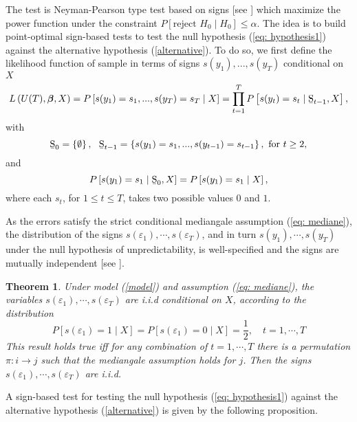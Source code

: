 \documentclass[harvard,11pt]{article}
\newtheorem{theorem}{Theorem}
\begin{document}
The test is Neyman-Pearson type test based on signs [see \citet{lehmann2006testing}] which maximize the
power function under the constraint $P\left[ \text{reject }%
H_{0}\mid H_{0}\right] \leq \alpha$. The idea is to build		
point-optimal sign-based tests to test the null hypothesis (\ref{eq:
hypothesis1}) against the alternative hypothesis (\ref{alternative}). To do
so, we first define the likelihood function of sample in terms of signs $%
s(y_{1}),...,s(y_{T})$ conditional on $X$%
\begin{equation*}
L\left( U(T),\bm{\beta}, X \right) =P\left[
s(y_{1})=s_{1},...,s(y_{T})=s_{T}\mid X\right] =\prod\limits_{t=1}^{T} P\left[ s(y_{t})=s_{t}\mid \text{\b{S}}_{t-1}, X\right] ,
\end{equation*}%
with 
\begin{equation*}
\text{\b{S}}_{0}=\left\{ \emptyset \right\} ,\text{ \ \b{S}}_{t-1}=\left\{
s(y_{1})=s_{1},...,s(y_{t-1})=s_{t-1}\right\} ,\text{ for }t\geq 2,
\end{equation*}%
and%
\begin{equation*}
P\left[ s(y_{1})=s_{1}\mid \text{\b{S}}_{0},X\right] =P%
\left[ s(y_{1})=s_{1}\mid X\right] ,
\end{equation*}%
where each $s_{t}$, for $1\leq t\leq T$, takes two possible values $0$ and $1
$. 

 As the errors satisfy the strict conditional mediangale assumption (\ref{eq: mediane}), the distribution of the signs $s(\varepsilon_1),\cdots,s(\varepsilon_T)$, and in turn $s(y_1),\cdots, s(y_T)$ under the null hypothesis of unpredictability, is well-specified and the signs are mutually independent [see \citet{coudin2009finite}].

\begin{theorem}\label{Theorem1}
Under model (\ref{model}) and assumption (\ref{eq: mediane}), the variables $s(\varepsilon_1),\cdots,s(\varepsilon_T)$ are i.i.d conditional on $X$, according to the distribution
\[
P[s(\varepsilon_1)=1\mid X]=P[s(\varepsilon_1)=0\mid X]=\frac{1}{2},\quad t=1,\cdots,T
\]
This result holds true iff for any combination of $t=1,\cdots,T$ there is a permutation $\pi: i\rightarrow j$ such that the mediangale assumption holds for $j$. Then the signs $s(\varepsilon_1),\cdots,s(\varepsilon_T)$ are i.i.d.

\end{theorem} A sign-based test for testing the null hypothesis (\ref{eq: hypothesis1})
against the alternative hypothesis (\ref{alternative}) is given by the
following proposition.
\end{document}
